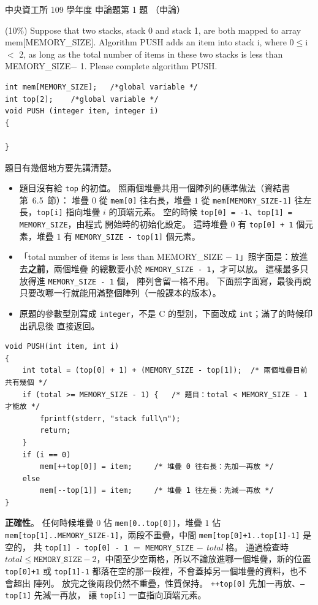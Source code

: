 \begin{pastexam}[label={px:ncu-109-dsa-12}]{中央資工所 109 學年度 申論題第 1 題}
（申論）

(10\%) Suppose that two stacks, stack 0 and stack 1, are both mapped to array mem[MEMORY\_SIZE].
Algorithm PUSH adds an item into stack i, where 0$\le$i$<$ 2, as long as the total number of items
in these two stacks is less than MEMORY\_SIZE$-$ 1. Please complete algorithm PUSH.
\begin{verbatim}
int mem[MEMORY_SIZE];   /*global variable */
int top[2];    /*global variable */
void PUSH (integer item, integer i)
{

}
\end{verbatim}
\end{pastexam}

\begin{pastsoln}
題目有幾個地方要先講清楚。
\begin{itemize}
\item 題目沒有給 \texttt{top} 的初值。 照兩個堆疊共用一個陣列的標準做法（資結書第~6.5~節）：
堆疊 $0$ 從 \texttt{mem[0]} 往右長，堆疊 $1$ 從 \texttt{mem[MEMORY\_SIZE-1]} 往左長，\texttt{top[i]}
指向堆疊 $i$ 的頂端元素。 空的時候 \texttt{top[0] = -1}、\texttt{top[1] = MEMORY\_SIZE}，由程式
開始時的初始化設定。 這時堆疊 $0$ 有 \texttt{top[0] + 1} 個元素，堆疊 $1$ 有
\texttt{MEMORY\_SIZE - top[1]} 個元素。
\item 「total number of items is less than MEMORY\_SIZE $-$ 1」照字面是：放進去\textbf{之前}，兩個堆疊
的總數要小於 \texttt{MEMORY\_SIZE - 1}，才可以放。 這樣最多只放得進 \texttt{MEMORY\_SIZE - 1} 個，
陣列會留一格不用。 下面照字面寫，最後再說只要改哪一行就能用滿整個陣列（一般課本的版本）。
\item 原題的參數型別寫成 \texttt{integer}，不是 C 的型別，下面改成 \texttt{int}；滿了的時候印出訊息後
直接返回。
\end{itemize}

\begin{verbatim}
void PUSH(int item, int i)
{
    int total = (top[0] + 1) + (MEMORY_SIZE - top[1]);  /* 兩個堆疊目前共有幾個 */
    if (total >= MEMORY_SIZE - 1) {   /* 題目：total < MEMORY_SIZE - 1 才能放 */
        fprintf(stderr, "stack full\n");
        return;
    }
    if (i == 0)
        mem[++top[0]] = item;     /* 堆疊 0 往右長：先加一再放 */
    else
        mem[--top[1]] = item;     /* 堆疊 1 往左長：先減一再放 */
}
\end{verbatim}

\textbf{正確性}。 任何時候堆疊 $0$ 佔 \texttt{mem[0..top[0]]}，堆疊 $1$ 佔
\texttt{mem[top[1]..MEMORY\_SIZE-1]}，兩段不重疊，中間 \texttt{mem[top[0]+1..top[1]-1]} 是空的，
共 \texttt{top[1] - top[0] - 1} $=$ \texttt{MEMORY\_SIZE} $-$ \textit{total} 格。 通過檢查時
$\mathit{total} \le \texttt{MEMORY\_SIZE} - 2$，中間至少空兩格，所以不論放進哪一個堆疊，新的位置
\texttt{top[0]+1} 或 \texttt{top[1]-1} 都落在空的那一段裡，不會蓋掉另一個堆疊的資料，也不會超出
陣列。 放完之後兩段仍然不重疊，性質保持。 \texttt{++top[0]} 先加一再放、\texttt{--top[1]} 先減一再放，
讓 \texttt{top[i]} 一直指向頂端元素。


\end{pastsoln}
